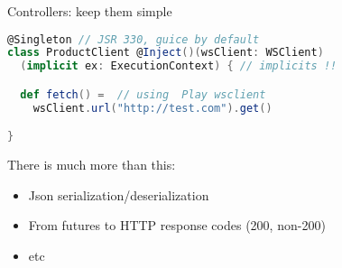 \documentclass[10pt]{beamer}
\providecommand{\eg}{e.\,g.}
\begin{document}
\begin{frame}
Controllers: keep them simple 
\end{frame}


\begin{frame}[fragile]
\begin{lstlisting}[language=Scala, basicstyle=\ttfamily]
@Singleton // JSR 330, guice by default 
class ProductClient @Inject()(wsClient: WSClient)  
  (implicit ex: ExecutionContext) { // implicits !! 

  def fetch() =  // using  Play wsclient 
    wsClient.url("http://test.com").get()

}
\end{lstlisting}
\end{frame}





\begin{frame}
There is much more than this:
\begin{itemize}
\item Json serialization/deserialization 
\item From futures to HTTP response codes (200, non-200)
\item etc
\end{itemize}
\end{frame}
\end{document}
